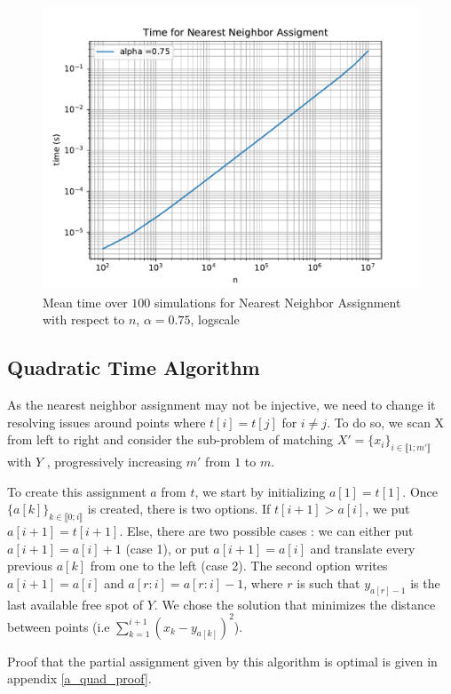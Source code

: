\documentclass[a4paper,12pt]{article}
\begin{document}
\begin{figure}[H]
\includegraphics[width = \columnwidth]{t_time.pdf}
\caption{Mean time over $100$ simulations for Nearest Neighbor Assignment with respect to $n$, $\alpha=0.75$, logscale}\label{t_time}
\end{figure}

\subsection{Quadratic Time Algorithm}

As the nearest neighbor assignment may not be injective, we need to change it resolving issues around points where $t[i] = t[j]$ for $i \neq j$. To do so, we scan X from left to right and consider the sub-problem of matching $X' = \{x_i \}_{i \in \llbracket 1;m' \rrbracket} $ with $Y$ , progressively increasing $m'$ from $1$ to $m$. 

To create this assignment $a$ from $t$, we start by initializing $a[1] = t[1]$. Once $\{a[k]\}_{k \in \llbracket 0;i \rrbracket}$ is created, there is two options. If $t[i+1]>a[i]$, we put $a[i+1]=t[i+1]$. Else, there are two possible cases : we can either put $a[i+1]=a[i]+1$ (case 1), or put $a[i+1]=a[i]$ and translate every previous $a[k]$ from one to the left (case 2). The second option writes $ a[i+1] = a[i]$ and $a[r:i] = a[r:i]-1 $, where $r$ is such that $y_{a[r]-1}$ is the last available free spot of $Y$. We chose the solution that minimizes the distance between points (i.e $\sum_{k=1}^{i+1} (x_k - y_{a[k]})^2$). 

Proof that the partial assignment given by this algorithm is optimal is given in appendix \ref{a_quad_proof}.\\
\end{document}

